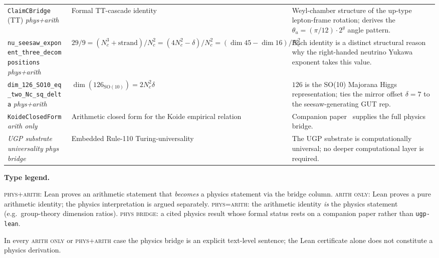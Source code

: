 \documentclass[11pt]{article}
\theoremstyle{remark}
\begin{document}
{\begin{tabularx}{\linewidth}{@{}>{\RaggedRight\arraybackslash}p{3.6cm} >{\RaggedRight\arraybackslash}X >{\RaggedRight\arraybackslash}X@{}}
\texttt{ClaimCBridge} (TT) \newline \textit{phys+arith} &
Formal TT-cascade identity &
Weyl-chamber structure of the up-type lepton-frame rotation; derives the $\theta_u = (\pi/12)\cdot 2^g$ angle pattern. \\

\texttt{nu\_seesaw\_exponent\_\allowbreak three\_decompositions} \newline \textit{phys+arith} &
$29/9 = (N_c^3 + \mathrm{strand})/N_c^2 = (4N_c^2 - \delta)/N_c^2 = (\dim 45 - \dim 16)/N_c^2$ &
Each identity is a distinct structural reason why the right-handed neutrino Yukawa exponent takes this value. \\

\texttt{dim\_126\_SO10\_eq\_\allowbreak two\_Nc\_sq\_delta} \newline \textit{phys+arith} &
$\dim(126_{\mathrm{SO}(10)}) = 2 N_c^2 \delta$ &
$126$ is the SO(10) Majorana Higgs representation; ties the mirror offset $\delta{=}7$ to the seesaw-generating GUT rep. \\

\texttt{KoideClosedForm} \newline \textit{arith only} &
Arithmetic closed form for the Koide empirical relation~\cite{Spivack2026_Koide} &
Companion paper~\cite{Spivack2026_Koide} supplies the full physics bridge. \\

\emph{UGP substrate universality} \newline \textit{phys bridge} &
Embedded Rule-110 Turing-universality~\cite{Wolfram2002,Cook2004} &
The UGP substrate is computationally universal; no deeper computational layer is required. \\
\bottomrule
\end{tabularx}
}

\smallskip
\noindent\textbf{Type legend.}
\begin{sloppypar}
\textsc{phys+arith}: Lean proves an arithmetic statement that \emph{becomes} a physics statement via the bridge column.
\textsc{arith only}: Lean proves a pure arithmetic identity; the physics interpretation is argued separately.
\textsc{phys=arith}: the arithmetic identity \emph{is} the physics statement (e.g.\ group-theory dimension ratios).
\textsc{phys bridge}: a cited physics result whose formal status rests on a companion paper rather than \texttt{ugp-lean}.
\end{sloppypar}
In every \textsc{arith only} or \textsc{phys+arith} case the physics bridge is an explicit text-level sentence; the Lean certificate alone does not constitute a physics derivation.
\end{document}
